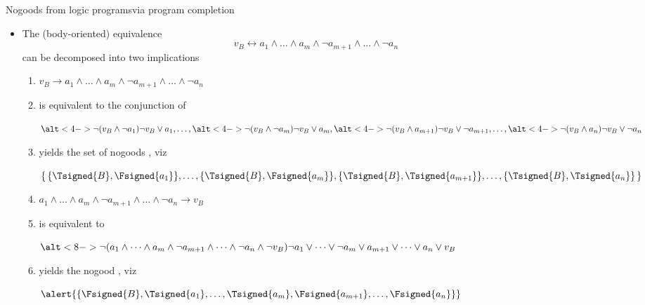 \begin{frame}{Nogoods from logic programs}{via program completion}

  \begin{itemize}
  \item<1-> The (body-oriented) equivalence
    \[
    v_B \leftrightarrow
         a_1     \wedge\dots\wedge      a_m \wedge
    \neg a_{m+1} \wedge\dots\wedge \neg a_n
    \]
    can be decomposed into two implications
    \medskip
    \begin{enumerate}\normalsize
    \item<only@2-5>
      \(
      v_B \to
           a_1     \wedge\dots\wedge      a_m \wedge
      \neg a_{m+1} \wedge\dots\wedge \neg a_n
      \)
      \par\medskip
    \item<only@3-5>[] is equivalent to the conjunction of
      \par\medskip
      \(
      \alt<4->{\neg(v_B\wedge\neg     a_1)}{\neg v_B\vee     a_1}
      ,\dots,
      \alt<4->{\neg(v_B\wedge\neg     a_m)}{\neg v_B\vee     a_m}
      ,
      \alt<4->{\neg(v_B\wedge a_{m+1})}{\neg v_B\vee\neg a_{m+1}}
      ,\dots,
      \alt<4->{\neg(v_B\wedge a_n)}{\neg v_B\vee\neg a_n}
      \)
      \par\medskip
    \item<only@5-5>[] yields the set of nogoods , viz
      \par\medskip
      \(
      \{\,
      \{\Tsigned{B},\Fsigned{a_1}\},
      \dots,
      \{\Tsigned{B},\Fsigned{a_m}\},
      \{\Tsigned{B},\Tsigned{a_{m+1}}\},
      \dots,
      \{\Tsigned{B},\Tsigned{a_n}\}
      \,\}
      \)
    \item<only@6-9>
      \(
      a_1 \wedge\dots\wedge      a_m\wedge \neg a_{m+1}\wedge\dots\wedge\neg a_n\rightarrow v_B
      \)
      \par\medskip
    \item<only@7-9>[] is equivalent to
      \par\medskip
      \(
      \alt<8->{\neg (     a_1\wedge\dots\wedge     a_m\wedge\neg a_{m+1}\wedge\dots\wedge \neg a_n\wedge\neg v_B)}%
              {      \neg a_1\vee  \dots\vee  \neg a_m\vee       a_{m+1}\vee  \dots\vee        a_n\vee       v_B }
      \)
      \par\medskip
    \item<only@9-9>[] yields the nogood , viz
      \par\medskip
      \(
      \alert{\{\Fsigned{B},\Tsigned{a_1},\dots,\Tsigned{a_m},\Fsigned{a_{m+1}},\dots,\Fsigned{a_n}\}}
      \)
  \end{enumerate}
\end{itemize}
\end{frame}
